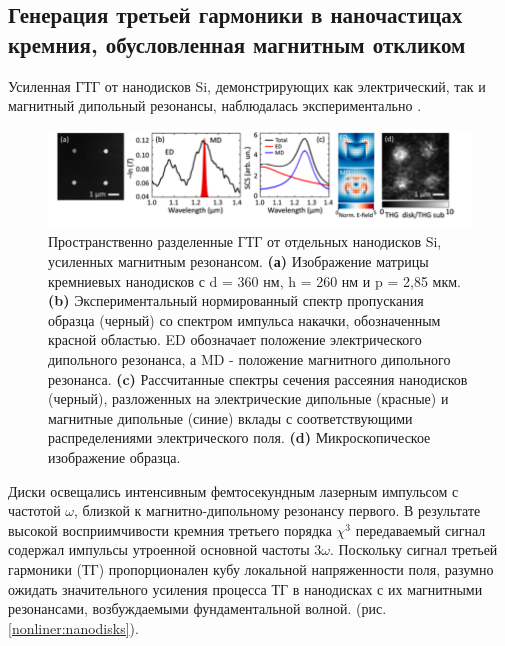 \subsection*{Генерация третьей гармоники в наночастицах кремния, обусловленная магнитным откликом}
\hspace*{2mm}
Усиленная ГТГ от нанодисков Si, демонстрирующих как электрический, так и магнитный дипольный резонансы, наблюдалась экспериментально \cite{shcherbakov2014enhanced}. 
\begin{figure}[h!]
	\centering
	\includegraphics[width=1\linewidth]{images/fig4.png}
	\caption{Пространственно разделенные ГТГ от отдельных нанодисков Si, усиленных магнитным резонансом. \textbf{(а)} Изображение матрицы кремниевых нанодисков с d = 360 нм, h = 260 нм и p = 2,85 мкм. \textbf{(b)} Экспериментальный нормированный спектр пропускания образца (черный) со спектром импульса накачки, обозначенным красной областью. ED  обозначает положение электрического дипольного резонанса, а MD - положение магнитного дипольного резонанса. \textbf{(c) }Рассчитанные спектры сечения рассеяния нанодисков (черный), разложенных на электрические дипольные (красные) и магнитные дипольные (синие) вклады с соответствующими распределениями электрического поля. \textbf{(d)} Микроскопическое изображение образца. \cite{shcherbakov2014enhanced}}
	\label{nonliner:nanodisks1}
\end{figure}
\hspace*{2mm}
Диски освещались интенсивным фемтосекундным лазерным импульсом с частотой $\omega$, близкой к магнитно-дипольному резонансу первого. В результате высокой восприимчивости кремния третьего порядка $\chi^3$ передаваемый сигнал содержал импульсы утроенной основной частоты $3\omega$. Поскольку сигнал третьей гармоники (ТГ) пропорционален кубу локальной напряженности поля, разумно ожидать значительного усиления процесса ТГ в нанодисках с их магнитными резонансами, возбуждаемыми фундаментальной волной. (рис. \ref{nonliner:nanodisks}). 
